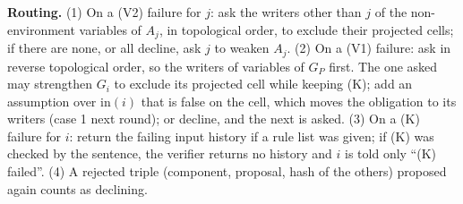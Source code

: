 \documentclass[10pt]{article}
\theoremstyle{tplain}\newtheorem{theorem}{Theorem}\newtheorem{lemma}[theorem]{Lemma}\newtheorem{proposition}[theorem]{Proposition}\newtheorem{corollary}[theorem]{Corollary}\newtheorem{claim}[theorem]{Claim}
\theoremstyle{tdef}\newtheorem{definition}[theorem]{Definition}
\newcommand{\inp}{\mathrm{in}}\newcommand{\outp}{\mathrm{out}}\newcommand{\ports}{\mathrm{ports}}
\begin{document}
\textbf{Routing.} (1) On a (V2) failure for $j$: ask the writers other than $j$ of the non-environment variables of $A_j$, in topological order, to exclude their projected cells; if there are none, or all decline, ask $j$ to weaken $A_j$. (2) On a (V1) failure: ask in reverse topological order, so the writers of variables of $G_P$ first. The one asked may strengthen $G_i$ to exclude its projected cell while keeping (K); add an assumption over $\inp(i)$ that is false on the cell, which moves the obligation to its writers (case 1 next round); or decline, and the next is asked. (3) On a (K) failure for $i$: return the failing input history if a rule list was given; if (K) was checked by the sentence, the verifier returns no history and $i$ is told only ``(K) failed''. (4) A rejected triple (component, proposal, hash of the others) proposed again counts as declining.
\end{document}
